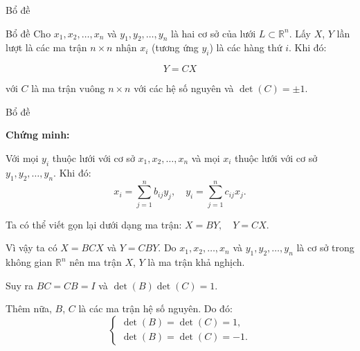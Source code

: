 

\begin{frame}{Bổ đề}
\begin{block}{Bổ đề}
Cho $x_1, x_2, \ldots, x_n$ và $y_1, y_2, \ldots, y_n$ là hai cơ sở của lưới $L \subset \mathbb{R}^n$.
Lấy $X$, $Y$ lần lượt là các ma trận $n \times n$ nhận $x_i$ (tương ứng $y_i$) là các hàng thứ $i$.
Khi đó:

\begin{equation} \label{equation:bo_de}
Y = CX
\end{equation}

với $C$ là ma trận vuông $n \times n$ với các hệ số nguyên
và $\det(C) = \pm 1$.
\end{block}
\end{frame}
\begin{frame}{Bổ đề}

\textbf{Chứng minh:}

Với mọi $y_i$ thuộc lưới với cơ sở $x_1, x_2, \ldots, x_n$ và mọi $x_i$ thuộc lưới với cơ sở $y_1, y_2, \ldots, y_n$. Khi đó:
\[
x_i = \sum_{j=1}^n b_{ij} y_j, \quad y_i = \sum_{j=1}^n c_{ij} x_j.
\]

Ta có thể viết gọn lại dưới dạng ma trận:
$X = BY, \quad Y = CX.$

Vì vậy ta có $X = BCX$ và $Y = CBY$. Do $x_1, x_2, \ldots, x_n$ và $y_1, y_2, \ldots, y_n$ là cơ sở trong không gian $\mathbb{R}^n$ nên ma trận $X$, $Y$ là ma trận khả nghịch.

Suy ra $BC = CB = I$ và $\det(B) \det(C) = 1$.

Thêm nữa, $B$, $C$ là các ma trận hệ số nguyên. Do đó:
\[
\begin{cases}
\det(B) = \det(C) = 1, \\
\det(B) = \det(C) = -1.
\end{cases}
\]

\end{frame}
